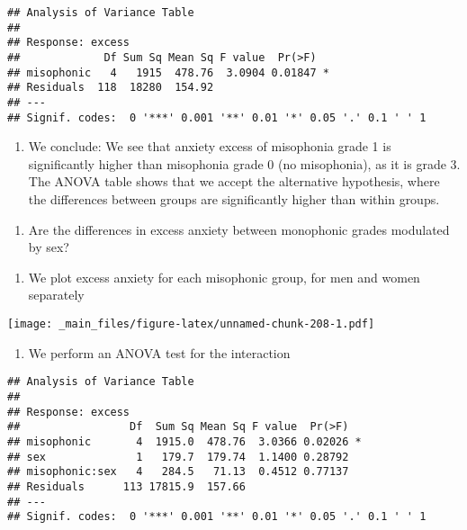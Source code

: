 \documentclass[
]{book}
\providecommand{\tightlist}{%
  \setlength{\itemsep}{0pt}\setlength{\parskip}{0pt}}
\begin{document}
\begin{verbatim}
## Analysis of Variance Table
## 
## Response: excess
##             Df Sum Sq Mean Sq F value  Pr(>F)  
## misophonic   4   1915  478.76  3.0904 0.01847 *
## Residuals  118  18280  154.92                  
## ---
## Signif. codes:  0 '***' 0.001 '**' 0.01 '*' 0.05 '.' 0.1 ' ' 1
\end{verbatim}

\begin{enumerate}
\def\labelenumi{\alph{enumi}.}
\setcounter{enumi}{2}
\tightlist
\item
  We conclude: We see that anxiety excess of misophonia grade 1 is significantly higher than misophonia grade 0 (no misophonia), as it is grade 3. The ANOVA table shows that we accept the alternative hypothesis, where the differences between groups are significantly higher than within groups.
\end{enumerate}

\begin{enumerate}
\def\labelenumi{\arabic{enumi}.}
\setcounter{enumi}{5}
\tightlist
\item
  Are the differences in excess anxiety between monophonic grades modulated by sex?
\end{enumerate}

\begin{enumerate}
\def\labelenumi{\alph{enumi}.}
\tightlist
\item
  We plot excess anxiety for each misophonic group, for men and women separately
\end{enumerate}

\texttt{[image: \_main\_files/figure-latex/unnamed-chunk-208-1.pdf]}

\begin{enumerate}
\def\labelenumi{\alph{enumi}.}
\setcounter{enumi}{1}
\tightlist
\item
  We perform an ANOVA test for the interaction
\end{enumerate}

\begin{verbatim}
## Analysis of Variance Table
## 
## Response: excess
##                 Df  Sum Sq Mean Sq F value  Pr(>F)  
## misophonic       4  1915.0  478.76  3.0366 0.02026 *
## sex              1   179.7  179.74  1.1400 0.28792  
## misophonic:sex   4   284.5   71.13  0.4512 0.77137  
## Residuals      113 17815.9  157.66                  
## ---
## Signif. codes:  0 '***' 0.001 '**' 0.01 '*' 0.05 '.' 0.1 ' ' 1
\end{verbatim}
\end{document}
